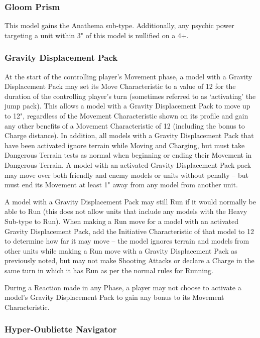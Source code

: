 \subsubsection{Gloom Prism} \label{Gloom Prism}

This model gains the Anathema sub-type. Additionally, any psychic power targeting a unit within 3" of this model is nullified on a 4+. \\

\subsubsection{Gravity Displacement Pack} \label{Gravity Displacement Pack}

At the start of the controlling player’s Movement phase, a model with a Gravity Displacement Pack may set its Move Characteristic to a value of 12 for the duration of the controlling player’s turn (sometimes referred to as ‘activating’ the jump pack). This allows a model with a Gravity Displacement Pack to move up to 12", regardless of the Movement Characteristic shown on its profile and gain any other benefits of a Movement Characteristic of 12 (including the bonus to Charge distance). In addition, all models with a Gravity Displacement Pack that have been activated ignore terrain while Moving and Charging, but must take Dangerous Terrain tests as normal when beginning or ending their Movement in Dangerous Terrain. A model with an activated Gravity Displacement Pack pack may move over both friendly and enemy models or units without penalty – but must end its Movement at least 1" away from any model from another unit.

A model with a Gravity Displacement Pack may still Run if it would normally be able to Run (this does not allow units that include any models with the Heavy Sub-type to Run). When making a Run move for a model with an activated Gravity Displacement Pack, add the Initiative Characteristic of that model to 12 to determine how far it may move – the model ignores terrain and models from other units while making a Run move with a Gravity Displacement Pack as previously noted, but may not make Shooting Attacks or declare a Charge in the same turn in which it has Run as per the normal rules for Running.

During a Reaction made in any Phase, a player may not choose to activate a model’s Gravity Displacement Pack to gain any bonus to its Movement Characteristic.

\subsubsection{Hyper-Oubliette Navigator} \label{Hyper-Oubliette Navigator}

